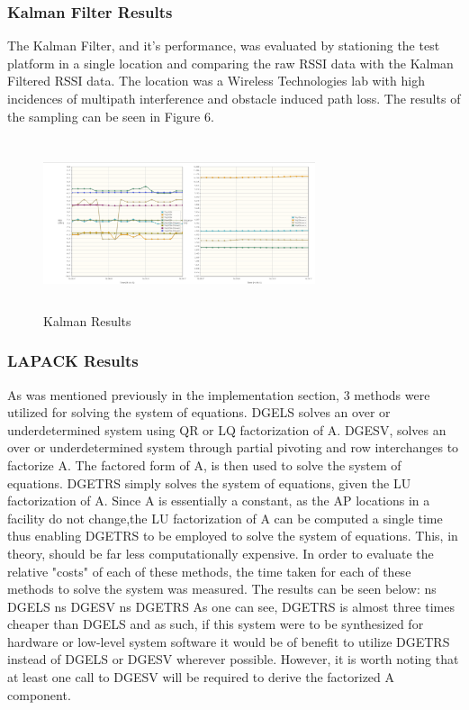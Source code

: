 \documentclass[conference]{IEEEtran}
\begin{document}
\subsubsection{Kalman Filter Results}
The Kalman Filter, and it's performance, was evaluated by stationing the test platform in a single location and comparing the raw RSSI data with the Kalman Filtered RSSI data. The location was a Wireless Technologies lab with high incidences of multipath interference and obstacle induced path loss. The results of the sampling can be seen in Figure 6.
\begin{figure}[H]
    \includegraphics[width=8cm,height=5cm]{2018-05-10-PHOTO-00000079.png}
    \caption{Kalman Results}
    \end{figure}
\subsubsection{LAPACK Results}
As was mentioned previously in the implementation section, 3 methods were utilized for solving the system of equations. DGELS solves an over or underdetermined system using QR or LQ factorization of A. DGESV, solves an over or underdetermined system through partial pivoting and row interchanges to factorize A. The factored form of A, is then used to solve the system of equations. DGETRS simply solves the system of equations, given the LU factorization of A. Since A is essentially a constant, as the AP locations in a facility do not change,the LU factorization of A can be  computed a single time thus enabling DGETRS to be employed to solve the system of equations. This, in theory, should be far less computationally expensive. In order to evaluate the relative "costs" of each of these methods, the time taken for each of these methods to solve the system was measured. The results can be seen below: ns DGELS ns DGESV ns DGETRS\newline
As one can see, DGETRS is almost three times cheaper than DGELS and as such, if this system were to be synthesized for hardware or low-level system software it would be of benefit to utilize DGETRS instead of DGELS or DGESV wherever possible. However, it is worth noting that at least one call to DGESV will be required to derive the factorized A component.
\end{document}
